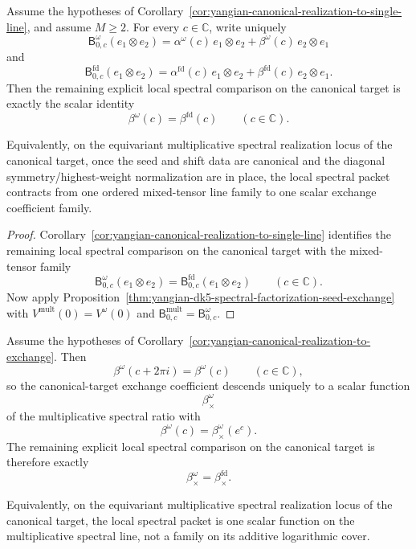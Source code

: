 \begin{corollary}
\label{cor:yangian-canonical-realization-to-exchange}
Assume the hypotheses of
Corollary~\ref{cor:yangian-canonical-realization-to-single-line}, and
assume \(M\ge 2\). For every \(c\in\mathbb C\), write uniquely
\[
\mathsf B_{0,c}^{\omega}(e_1\otimes e_2)
=
\alpha^\omega(c)\,e_1\otimes e_2
+\beta^\omega(c)\,e_2\otimes e_1
\]
and
\[
\mathsf B_{0,c}^{\mathrm{fd}}(e_1\otimes e_2)
=
\alpha^{\mathrm{fd}}(c)\,e_1\otimes e_2
+\beta^{\mathrm{fd}}(c)\,e_2\otimes e_1.
\]
Then the remaining explicit local spectral comparison on the canonical
target is exactly the scalar identity
\[
\beta^\omega(c)=\beta^{\mathrm{fd}}(c)
\qquad (c\in\mathbb C).
\]

Equivalently, on the equivariant multiplicative spectral realization
locus of the canonical target, once the seed and shift data are
canonical and the diagonal symmetry/highest-weight normalization are in
place, the local spectral packet contracts from one ordered
mixed-tensor line family to one scalar exchange coefficient family.
\end{corollary}

\begin{proof}
Corollary~\ref{cor:yangian-canonical-realization-to-single-line}
identifies the remaining local spectral comparison on the canonical
target with the mixed-tensor family
\[
\mathsf B_{0,c}^{\omega}(e_1\otimes e_2)
=
\mathsf B_{0,c}^{\mathrm{fd}}(e_1\otimes e_2)
\qquad (c\in\mathbb C).
\]
Now apply
Proposition~\ref{thm:yangian-dk5-spectral-factorization-seed-exchange}
with \(V^{\mathrm{mult}}(0)=V^\omega(0)\) and
\(\mathsf B_{0,c}^{\mathrm{mult}}=\mathsf B_{0,c}^{\omega}\).
\end{proof}

\begin{corollary}
\label{cor:yangian-canonical-realization-to-exchange-mult}
Assume the hypotheses of
Corollary~\ref{cor:yangian-canonical-realization-to-exchange}. Then
\[
\beta^\omega(c+2\pi i)=\beta^\omega(c)
\qquad (c\in\mathbb C),
\]
so the canonical-target exchange coefficient descends uniquely to a
scalar function
\[
\beta_\times^\omega
\]
of the multiplicative spectral ratio with
\[
\beta^\omega(c)=\beta_\times^\omega(e^c).
\]
The remaining explicit local spectral comparison on the canonical
target is therefore exactly
\[
\beta_\times^\omega=\beta_\times^{\mathrm{fd}}.
\]

Equivalently, on the equivariant multiplicative spectral realization
locus of the canonical target, the local spectral packet is one scalar
function on the multiplicative spectral line, not a family on its
additive logarithmic cover.
\end{corollary}

